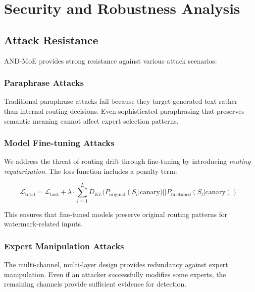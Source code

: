 \documentclass[letterpaper,twocolumn,10pt]{article}
\begin{document}
\section{Security and Robustness Analysis}

\subsection{Attack Resistance}

AND-MoE provides strong resistance against various attack scenarios:

\subsubsection{Paraphrase Attacks}

Traditional paraphrase attacks fail because they target generated text rather than internal routing decisions. Even sophisticated paraphrasing that preserves semantic meaning cannot affect expert selection patterns.

\subsubsection{Model Fine-tuning Attacks}

We address the threat of routing drift through fine-tuning by introducing \textit{routing regularization}. The loss function includes a penalty term:

\begin{equation}
\mathcal{L}_{\text{total}} = \mathcal{L}_{\text{task}} + \lambda \cdot \sum_{l=1}^{L} D_{KL}(P_{\text{original}}(S_l|\text{canary}) || P_{\text{finetuned}}(S_l|\text{canary}))
\end{equation}

This ensures that fine-tuned models preserve original routing patterns for watermark-related inputs.

\subsubsection{Expert Manipulation Attacks}

The multi-channel, multi-layer design provides redundancy against expert manipulation. Even if an attacker successfully modifies some experts, the remaining channels provide sufficient evidence for detection.
\end{document}
